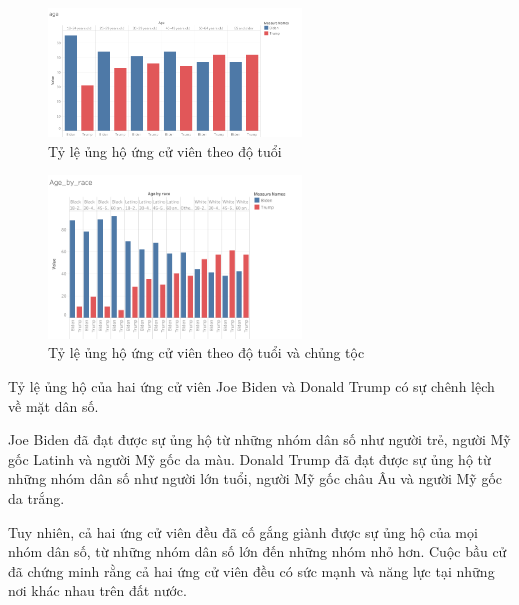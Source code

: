 \documentclass[14pt, a4paper]{article}
\numberwithin{equation}{section}
\numberwithin{figure}{section}
\numberwithin{dl}{section}
\numberwithin{md}{section}
\numberwithin{bd}{section}
\numberwithin{dn}{section}
\numberwithin{hq}{section}
\begin{document}
    \begin{figure}[h!]
        \centering
        \includegraphics[width=0.6\textwidth]{figures/age.png}
        \caption{Tỷ lệ ủng hộ ứng cử viên theo độ tuổi}
    \end{figure}

    \begin{figure}[h!]
        \centering
        \includegraphics[width=0.6\textwidth]{figures/Age_by_race.png}
        \caption{Tỷ lệ ủng hộ ứng cử viên theo độ tuổi và chủng tộc}
    \end{figure}

    Tỷ lệ ủng hộ của hai ứng cử viên Joe Biden và Donald Trump có sự chênh lệch về mặt dân số.

    Joe Biden đã đạt được sự ủng hộ từ những nhóm dân số như người trẻ, người Mỹ gốc Latinh và người Mỹ gốc da màu. 
    Donald Trump đã đạt được sự ủng hộ từ những nhóm dân số như người lớn tuổi, người Mỹ gốc châu Âu và người Mỹ gốc da trắng.

    Tuy nhiên, cả hai ứng cử viên đều đã cố gắng giành được sự ủng hộ của mọi nhóm dân số, từ những nhóm dân số lớn đến những nhóm nhỏ hơn. 
    Cuộc bầu cử đã chứng minh rằng cả hai ứng cử viên đều có sức mạnh và năng lực tại những nơi khác nhau trên đất nước.
\end{document}
